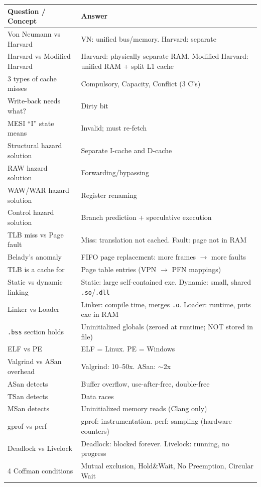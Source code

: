 \documentclass[11pt,a4paper]{article}
\begin{document}
\begin{longtable}{L{5.5cm} L{8cm}}
\toprule
\textbf{Question / Concept} & \textbf{Answer} \\
\midrule
Von Neumann vs Harvard & VN: unified bus/memory. Harvard: separate \\
Harvard vs Modified Harvard & Harvard: physically separate RAM. Modified Harvard: unified RAM + split L1 cache \\
3 types of cache misses & Compulsory, Capacity, Conflict (3 C's) \\
Write-back needs what? & Dirty bit \\
MESI ``I'' state means & Invalid; must re-fetch \\
Structural hazard solution & Separate I-cache and D-cache \\
RAW hazard solution & Forwarding/bypassing \\
WAW/WAR hazard solution & Register renaming \\
Control hazard solution & Branch prediction + speculative execution \\
TLB miss vs Page fault & Miss: translation not cached. Fault: page not in RAM \\
Belady's anomaly & FIFO page replacement: more frames $\to$ more faults \\
TLB is a cache for & Page table entries (VPN $\to$ PFN mappings) \\
Static vs dynamic linking & Static: large self-contained exe. Dynamic: small, shared \texttt{.so}/\texttt{.dll} \\
Linker vs Loader & Linker: compile time, merges \texttt{.o}. Loader: runtime, puts exe in RAM \\
\texttt{.bss} section holds & Uninitialized globals (zeroed at runtime; NOT stored in file) \\
ELF vs PE & ELF = Linux. PE = Windows \\
Valgrind vs ASan overhead & Valgrind: 10--50x. ASan: $\sim$2x \\
ASan detects & Buffer overflow, use-after-free, double-free \\
TSan detects & Data races \\
MSan detects & Uninitialized memory reads (Clang only) \\
gprof vs perf & gprof: instrumentation. perf: sampling (hardware counters) \\
Deadlock vs Livelock & Deadlock: blocked forever. Livelock: running, no progress \\
4 Coffman conditions & Mutual exclusion, Hold\&Wait, No Preemption, Circular Wait \\

\end{longtable}
\end{document}
